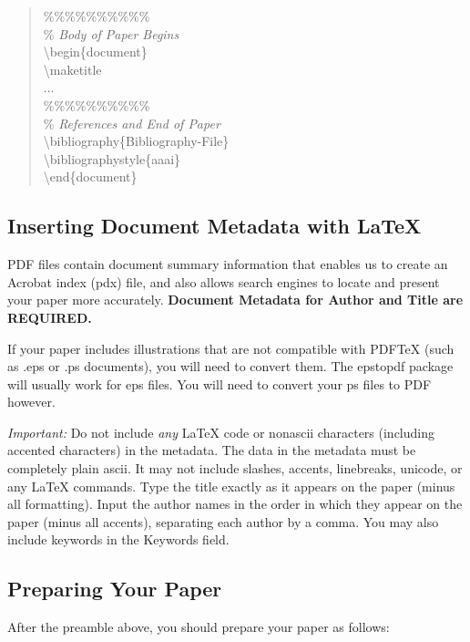 \documentclass[letterpaper]{article}
\begin{document}
\begin{quote}
\begin{small}
			\%\%\%\%\%\%\%\%\%\%\\
			\% \textit{Body of Paper Begins}\\
			\textbackslash begin\{document\}\\
			\textbackslash maketitle\\
			...\\
			\%\%\%\%\%\%\%\%\%\%\\
			\% \textit{References and End of Paper}\\
			\textbackslash bibliography\{Bibliography-File\}\\
			\textbackslash bibliographystyle\{aaai\}\\
			\textbackslash end\{document\}
		\end{small}
	\end{quote}
	
	\subsection{Inserting Document Metadata with \LaTeX{}}
	PDF files contain document summary information that enables us to create an Acrobat index (pdx) file, and also allows search engines to locate and present your paper more accurately. \textbf{Document Metadata  for Author and Title are REQUIRED.} 
	
	If your paper includes illustrations that are not compatible with PDF\TeX{} (such as .eps or .ps documents), you will need to convert them. The epstopdf package will usually work for eps files. You will need to convert your ps files to PDF however.
	
	\textit{Important:} Do not include \textit{any} \LaTeX{} code or nonascii characters (including accented characters) in the metadata. The data in the metadata must be completely plain ascii. It may not include slashes, accents, linebreaks, unicode, or any \LaTeX{} commands. Type the title exactly as it appears on the paper (minus all formatting). Input the author names in the order in which they appear on the paper (minus all accents), separating each author by a comma. You may also include keywords in the Keywords field.
	
	
	
	\subsection{Preparing Your Paper}
	
	After the preamble above, you should prepare your paper as follows:
	
\end{document}
